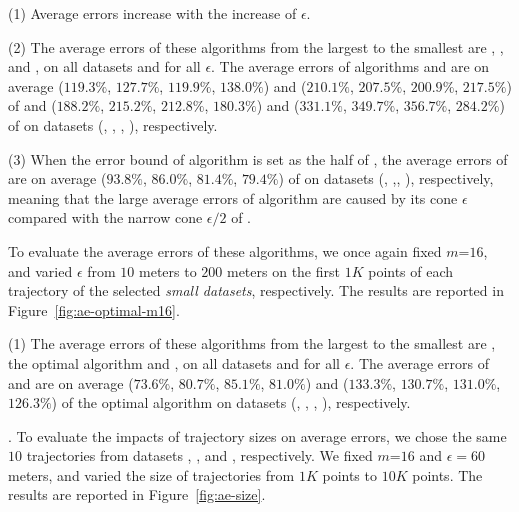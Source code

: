 {\ni(1) Average errors increase with the increase of $\epsilon$.

\ni(2) The average errors of these algorithms from the largest to the smallest are \cista, \cist, \dps and \squishe, on all datasets and for all $\epsilon$.
The average errors of algorithms \cist and \cista are on average
($119.3\%$, $127.7\%$, $119.9\%$, $138.0\%$)
and ($210.1\%$, $207.5\%$, $200.9\%$, $217.5\%$)
of \dps and ($188.2\%$, $215.2\%$, $212.8\%$, $180.3\%$) and
($331.1\%$, $349.7\%$, $356.7\%$, $284.2\%$)
 of \squishe on datasets (\sercar, \geolife, \mopsi, \pricar), respectively.

\ni(3) When the error bound of algorithm \cista is set as the half of \cist, the
average errors of \cista are on average ($93.8\%$, $86.0\%$, $81.4\%$, {$79.4\%$}) of \cist on {datasets} (\sercar, \geolife,\mopsi, \pricar), respectively, meaning that the large average errors of algorithm \cista are caused by its cone \wrt $\epsilon$ compared with the narrow cone \wrt $\epsilon/2$ of \cist.

To evaluate the average errors of these algorithms, we once again fixed {$m$=$16$}, and
varied $\epsilon$ from $10$ meters to $200$ meters on the first $1K$ points of each trajectory of the selected \textit{small datasets}, respectively.
The results are reported in Figure~\ref{fig:ae-optimal-m16}.

\ni(1) The average errors of these algorithms from the largest to the smallest are \cista, the optimal algorithm and \cist, on all datasets and for all $\epsilon$.
The average errors of \cist and \cista are on average
($73.6\%$, $80.7\%$, $85.1\%$, $81.0\%$)
and ($133.3\%$, $130.7\%$, $131.0\%$, $126.3\%$)
of the optimal algorithm on datasets (\sercar, \geolife, \mopsi, \pricar), respectively.

.
To evaluate the impacts of trajectory sizes on average errors, we chose the same
{$10$} trajectories from  datasets \sercar, \geolife, \mopsi and \pricar, respectively.
We fixed {$m$=$16$} and $\epsilon = 60$ meters, and varied the size  of trajectories from $1K$ points to $10K$ points.
%
The results are reported in Figure~\ref{fig:ae-size}.

}
